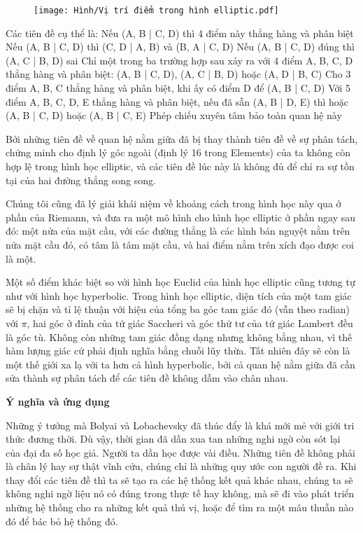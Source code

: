 \begin{multicols}{2}
	\begin{figure}[ht]
		\texttt{[image: Hình/Vị trí điểm trong hình elliptic.pdf]}
	\end{figure}
	
	Các tiên đề cụ thể là:
	Nếu (A, B | C, D) thì 4 điểm này thẳng hàng và phân biệt
	Nếu (A, B | C, D) thì (C, D | A, B) và (B, A | C, D)
	Nếu (A, B | C, D) đúng thì (A, C | B, D) sai
	Chỉ một trong ba trường hợp sau xảy ra với 4 điểm A, B, C, D thẳng hàng và phân biệt: (A, B | C, D), (A, C | B, D) hoặc (A, D | B, C)
	Cho 3 điểm A, B, C thẳng hàng và phân biệt, khi ấy có điểm D để (A, B | C, D)
	Với 5 điểm A, B, C, D, E thẳng hàng và phân biệt, nếu đã sẵn (A, B | D, E) thì hoặc (A, B | C, D) hoặc (A, B | C, E)
	Phép chiếu xuyên tâm bảo toàn quan hệ này
	
	Bởi những tiên đề về quan hệ nằm giữa đã bị thay thành tiên đề về sự phân tách, chứng minh cho định lý góc ngoài (định lý 16 trong Elements) của ta không còn hợp lệ trong hình học elliptic, và các  tiên đề lúc này là không đủ để chỉ ra sự tồn tại của hai đường thẳng song song. 
	
	Chúng tôi cũng đã lý giải khái niệm về khoảng cách trong hình học này qua ở phần của Riemann, và đưa ra một mô hình cho hình học elliptic ở phần ngay sau đó: một nửa của mặt cầu, với các đường thẳng là các hình bán nguyệt nằm trên nửa mặt cầu đó, có tâm là tâm mặt cầu, và hai điểm nằm trên xích đạo được coi là một. 
	
	Một số điểm khác biệt so với hình học Euclid của hình học elliptic cũng tương tự như với hình học hyperbolic. Trong hình học elliptic, diện tích của một tam giác sẽ bị chặn và tỉ lệ thuận với hiệu của tổng ba góc tam giác đó (vẫn theo radian) với $\pi$, hai góc ở đỉnh của tứ giác Saccheri và góc thứ tư của tứ giác Lambert đều là góc tù. Không còn những tam giác đồng dạng nhưng không bằng nhau, vì thế hàm lượng giác cứ phải định nghĩa bằng chuỗi lũy thừa. Tất nhiên đây sẽ còn là một thế giới xa lạ với ta hơn cả hình hyperbolic, bởi cả quan hệ nằm giữa đã cần sửa thành sự phân tách để các tiên đề không dẫm vào chân nhau. 
	
	\textbf{\color{lichsutoanhoc}Ý nghĩa và ứng dụng}
	
	Những ý tưởng mà Bolyai và Lobachevsky đã thúc đẩy là khá mới mẻ với giới tri thức đương thời. Dù vậy, thời gian đã dần xua tan những nghi ngờ còn sót lại của đại đa số học giả. Người ta dần học được vài điều. Những tiên đề không phải là chân lý hay sự thật vĩnh cửu, chúng chỉ là những quy ước con người đề ra. Khi thay đổi các tiên đề thì ta sẽ tạo ra các hệ thống kết quả khác nhau, chúng ta sẽ không nghi ngờ liệu nó có đúng trong thực tế hay không, mà sẽ đi vào phát triển những hệ thống cho ra những kết quả thú vị, hoặc để tìm ra một mâu thuẫn nào đó để bác bỏ hệ thống đó.
	

\end{multicols}
